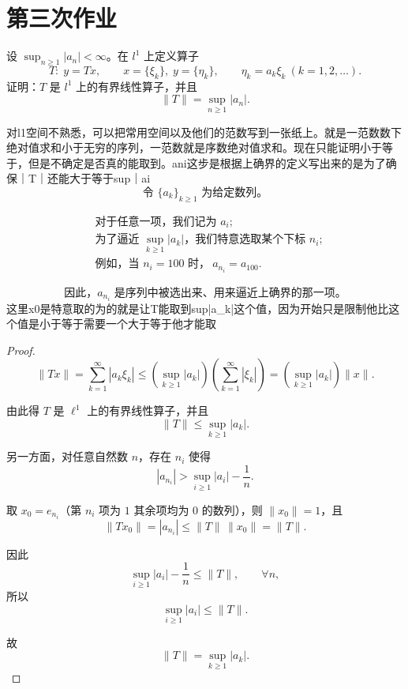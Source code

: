 \section{第三次作业}
\begin{homework}[题目 1]

设 $\sup_{n\ge 1}|a_n|<\infty$。在 $l^1$ 上定义算子
\[
T:\; y = Tx,\qquad x=\{\xi_k\},\; y=\{\eta_k\},\qquad \eta_k = a_k \xi_k\ (k=1,2,\ldots).
\]
证明：$T$ 是 $l^1$ 上的有界线性算子，并且
\[
\|T\|=\sup_{n\ge 1}|a_n|.
\]

\end{homework}
\begin{dxtips}
对l1空间不熟悉，可以把常用空间以及他们的范数写到一张纸上。就是一范数数下绝对值求和小于无穷的序列，一范数就是序数绝对值求和。现在只能证明小于等于，但是不确定是否真的能取到。ani这步是根据上确界的定义写出来的是为了确保｜T｜还能大于等于sup｜ai\[
\text{令 } \{a_k\}_{k\ge1} \text{ 为给定数列。}
\]

\[
\begin{aligned}
&\text{对于任意一项，我们记为 } a_i ; \\[4pt]
&\text{为了逼近 } \sup_{k\ge1}|a_k| \text{，我们特意选取某个下标 } n_i ; \\[4pt]
&\text{例如，当 } n_i = 100 \text{ 时，} \ a_{n_i} = a_{100}. 
\end{aligned}
\]

\[
\text{因此，} a_{n_i} \text{ 是序列中被选出来、用来逼近上确界的那一项。}
\]
这里x0是特意取的为的就是让T能取到sup|a_k|这个值，因为开始只是限制他比这个值是小于等于需要一个大于等于他才能取
\end{dxtips}
\begin{proof}
    

\[
\|Tx\|
= \sum_{k=1}^{\infty} |a_k \xi_k|
\le \left( \sup_{k\ge 1} |a_k| \right)
     \left( \sum_{k=1}^{\infty} |\xi_k| \right)
= \left( \sup_{k\ge 1} |a_k| \right) \|x\|.
\]

由此得 $T$ 是 $\ell^1$ 上的有界线性算子，并且
\[
\|T\| \le \sup_{k\ge 1} |a_k|.
\]

另一方面，对任意自然数 $n$，存在 $n_i$ 使得
\[
|a_{n_i}| > \sup_{i\ge 1} |a_i| - \frac{1}{n}.
\]

取 $x_0 = e_{n_i}$（第 $n_i$ 项为 $1$ 其余项均为 $0$ 的数列），则 $\|x_0\| = 1$，且
\[
\|Tx_0\| = |a_{n_i}|
\le \|T\| \, \|x_0\|
= \|T\|.
\]

因此
\[
\sup_{i\ge 1} |a_i| - \frac{1}{n} \le \|T\|, \qquad \forall n,
\]
所以
\[
\sup_{i\ge 1} |a_i| \le \|T\|.
\]

故
\[
\|T\| = \sup_{k\ge 1} |a_k|.
\]
\end{proof}
